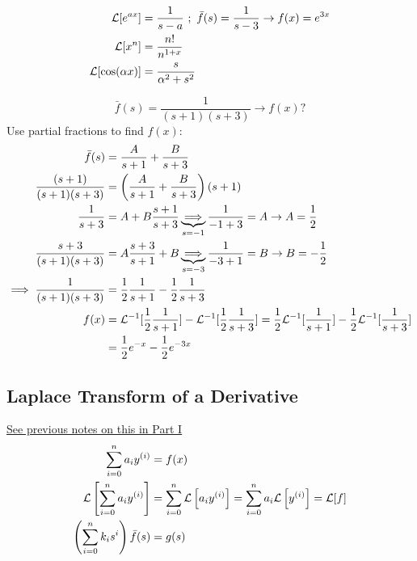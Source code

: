 \documentclass[Maths.tex]{subfiles}
\begin{document}
\begin{example}
\begin{align*}
    \mathcal{L}[e^{ax}] &= \frac{1}{s - a} ~;~ \bar{f}(s) = \frac{1}{s - 3} \to f(x) = e^{3x} \\
    \mathcal{L}[x^n] &= \frac{n!}{n^{1 + x}} \\
    \mathcal{L}[\cos(\alpha x)] &= \frac{s}{\alpha^2 + s^2}
\end{align*}
\end{example}

\begin{example}
\begin{equation*}
    \bar{f}(s) = \frac{1}{(s + 1)(s + 3)} \to f(x)?
\end{equation*}
Use partial fractions to find $f(x)$:
\begin{align*}
    \bar{f}(s) &= \frac{A}{s + 1} + \frac{B}{s + 3} \\
    \frac{(s + 1)}{(s + 1)(s + 3)} &= \left(\frac{A}{s + 1} + \frac{B}{s + 3}\right)(s + 1) \\
    \frac{1}{s + 3} &= A + B\frac{s + 1}{s + 3} \underbrace{\implies}_{s = -1} \frac{1}{-1 + 3} = A \to A = \frac{1}{2} \\
    \frac{s + 3}{(s + 1)(s + 3)} &= A\frac{s + 3}{s + 1} + B \underbrace{\implies}_{s = -3} \frac{1}{-3 + 1} = B \to B = -\frac{1}{2} \\
    \implies \frac{1}{(s + 1)(s + 3)} &= \frac{1}{2}\frac{1}{s + 1} - \frac{1}{2}\frac{1}{s + 3} \\
    f(x) &= \mathcal{L}^{-1}[\frac{1}{2}\frac{1}{s + 1}] - \mathcal{L}^{-1}[\frac{1}{2}\frac{1}{s + 3}] = \frac{1}{2}\mathcal{L}^{-1}[\frac{1}{s + 1}] - \frac{1}{2}\mathcal{L}^{-1}[\frac{1}{s + 3}] \\
    &= \frac{1}{2}e^{-x} - \frac{1}{2}e^{-3x}
\end{align*}
\end{example}

\subsection{Laplace Transform of a Derivative}
\hyperlink{page.39}{See previous notes on this in Part \RN{1}}
\begin{align*}
    \sum_{i = 0}^n a_i y^{(i)} &= f(x) \\
    \mathcal{L}\left[\sum_{i = 0}^n a_i y^{(i)}\right] &= \sum_{i = 0}^n \mathcal{L}\left[a_i y^{(i)}\right] = \sum_{i = 0}^n a_i \mathcal{L}\left[y^{(i)}\right] = \mathcal{L}[f] \\
    \left(\sum_{i = 0}^n k_i s^i\right)\bar{f}(s) &= g(s)
\end{align*}
\end{document}

